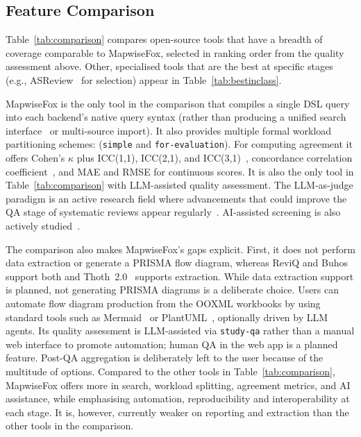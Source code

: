 \documentclass[preprint,12pt, a4paper]{elsarticle}
\begin{document}
\subsection{Feature Comparison}

Table~\ref{tab:comparison} compares open-source tools that have a breadth of
coverage comparable to MapwiseFox, selected in ranking order from the quality
assessment above. Other, specialised tools that are the best at specific
stages (e.g., ASReview~\cite{van2021} for selection) appear in
Table~\ref{tab:bestinclass}.

MapwiseFox is the only tool in the comparison that compiles a
single DSL query into each backend's native query syntax (rather than
producing a unified search interface~\cite{arc2026} or multi-source import).
It also provides multiple formal workload partitioning schemes:
(\texttt{simple} and \texttt{for-evaluation}). For computing agreement it
offers Cohen's $\kappa$ plus ICC(1,1), ICC(2,1), and
ICC(3,1)~\cite{shrout1979}, concordance correlation
coefficient~\cite{lin1989}, and MAE and RMSE for continuous scores.
It is also the only tool in Table~\ref{tab:comparison} with LLM-assisted
quality assessment. The LLM-as-judge paradigm is an active research field where
advancements that could improve the QA stage of systematic reviews appear
regularly~\cite{llm-as-a-judge2025,auditablepipeline2026}. AI-assisted
screening is also actively studied~\cite{van2021,arc2026,aim2026,cgpt2026}.

The comparison also makes MapwiseFox's gaps explicit. First, it does not
perform data extraction or generate a PRISMA flow diagram, whereas ReviQ and
Buhos~\cite{buhos2018} support both and Thoth~2.0~\cite{thoth2025}
supports extraction. While data extraction support is planned, not generating
PRISMA diagrams is a deliberate choice. Users can automate flow diagram
production from the OOXML workbooks by using standard tools such as
Mermaid~\cite{mermaid} or PlantUML~\cite{plantuml}, optionally driven by LLM agents.
Its quality assessment is LLM-assisted via \texttt{study-qa} rather than a
manual web interface to promote automation; human QA in the web app is a
planned feature. Post-QA aggregation is deliberately left to the user because
of the multitude of options. Compared to the other tools in
Table~\ref{tab:comparison}, MapwiseFox offers more in search, workload
splitting, agreement metrics, and AI assistance, while emphasising
automation, reproducibility and interoperability at each stage. It is,
however, currently weaker on reporting and extraction than the other tools in
the comparison.
\end{document}

